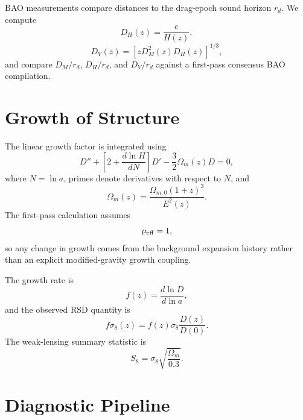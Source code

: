 \documentclass[11pt,a4paper]{article}
\begin{document}
BAO measurements compare distances to the drag-epoch sound horizon $r_d$. We compute
\begin{equation}
D_H(z)=\frac{c}{H(z)},
\end{equation}
\begin{equation}
D_V(z)=\left[zD_M^2(z)D_H(z)\right]^{1/3},
\end{equation}
and compare $D_M/r_d$, $D_H/r_d$, and $D_V/r_d$ against a first-pass consensus BAO compilation.

\section{Growth of Structure}

The linear growth factor is integrated using
\begin{equation}
D''+\left[2+\frac{d\ln H}{dN}\right]D'-\frac{3}{2}\Omega_m(z)D=0,
\end{equation}
where $N=\ln a$, primes denote derivatives with respect to $N$, and
\begin{equation}
\Omega_m(z)=\frac{\Omega_{m,0}(1+z)^3}{E^2(z)}.
\end{equation}
The first-pass calculation assumes
\begin{equation}
\mu_{\rm eff}=1,
\end{equation}
so any change in growth comes from the background expansion history rather than an explicit modified-gravity growth coupling.

The growth rate is
\begin{equation}
f(z)=\frac{d\ln D}{d\ln a},
\end{equation}
and the observed RSD quantity is
\begin{equation}
f\sigma_8(z)=f(z)\sigma_8\frac{D(z)}{D(0)}.
\end{equation}
The weak-lensing summary statistic is
\begin{equation}
S_8=\sigma_8\sqrt{\frac{\Omega_m}{0.3}}.
\end{equation}

\section{Diagnostic Pipeline}
\end{document}
